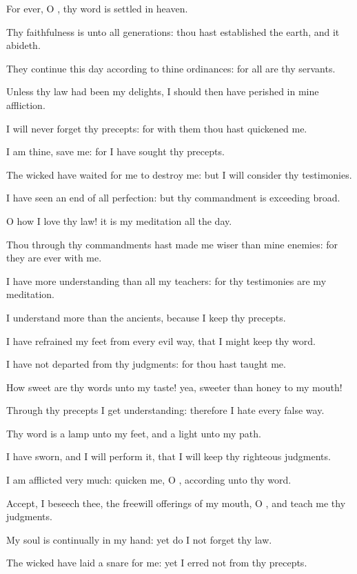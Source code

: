 \verse For ever, O \LORD, thy word is settled in heaven.

\verse Thy faithfulness is unto all generations: thou hast established the earth, and it abideth.

\verse They continue this day according to thine ordinances: for all are thy servants.

\verse Unless thy law had been my delights, I should then have perished in mine affliction.

\verse I will never forget thy precepts: for with them thou hast quickened me.

\verse I am thine, save me: for I have sought thy precepts.

\verse The wicked have waited for me to destroy me: but I will consider thy testimonies.

\verse I have seen an end of all perfection: but thy commandment is exceeding broad.

\verse O how I love thy law! it is my meditation all the day.

\verse Thou through thy commandments hast made me wiser than mine enemies: for they are ever with me.

\verse I have more understanding than all my teachers: for thy testimonies are my meditation.

\verse I understand more than the ancients, because I keep thy precepts.

\verse I have refrained my feet from every evil way, that I might keep thy word.

\verse I have not departed from thy judgments: for thou hast taught me.

\verse How sweet are thy words unto my taste! yea, sweeter than honey to my mouth!

\verse Through thy precepts I get understanding: therefore I hate every false way.

\verse Thy word is a lamp unto my feet, and a light unto my path.

\verse I have sworn, and I will perform it, that I will keep thy righteous judgments.

\verse I am afflicted very much: quicken me, O \LORD, according unto thy word.

\verse Accept, I beseech thee, the freewill offerings of my mouth, O \LORD, and teach me thy judgments.

\verse My soul is continually in my hand: yet do I not forget thy law.

\verse The wicked have laid a snare for me: yet I erred not from thy precepts.

